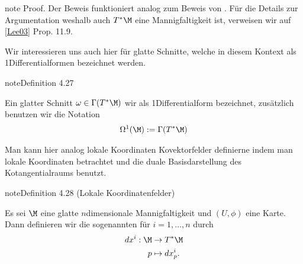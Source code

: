 \documentclass[letterpaper,10pt,german]{jupyterBook}
\begin{document}
\begin{sphinxadmonition}{note}
\sphinxAtStartPar
Proof. Der Beweis funktioniert analog zum Beweis von {\hyperref[\detokenize{manifolds/tangential:lem:tanbundle}]{}}. Für die Details zur Argumentation weshalb auch \(T^\ast\M\) eine Mannigfaltigkeit ist, verweisen wir auf {[}\hyperlink{cite.references:id18}{Lee03}{]} Prop. 11.9.
\end{sphinxadmonition}

\sphinxAtStartPar
Wir interessieren uns auch hier für glatte Schnitte, welche in diesem Kontext als 1\sphinxhyphen{}Differentialformen bezeichnet werden.
\label{manifolds/tangential:definition-37}
\begin{sphinxadmonition}{note}{Definition 4.27}



\sphinxAtStartPar
Ein glatter Schnitt \(\omega\in\Gamma(T^\ast\M)\) wir als 1\sphinxhyphen{}Differentialform bezeichnet, zusätzlich benutzen wir die Notation
\begin{equation*}
\begin{split}\Omega^1(\M) := \Gamma(T^\ast\M)\end{split}
\end{equation*}\end{sphinxadmonition}

\sphinxAtStartPar
Man kann hier analog lokale Koordinaten Kovektorfelder definierne indem man lokale Koordinaten betrachtet und die duale Basisdarstellung des Kotangentialraums benutzt.
\label{manifolds/tangential:definition-38}
\begin{sphinxadmonition}{note}{Definition 4.28 (Lokale Koordinatenfelder)}



\sphinxAtStartPar
Es sei \(\M\) eine glatte \(n\)\sphinxhyphen{}dimensionale Mannigfaltigkeit und \((U,\phi)\) eine Karte.
Dann definieren wir die sogenannten  für \(i=1,\ldots,n\) durch
\begin{equation*}
\begin{split}dx^{i}:\M&\to T^\ast\M\\
p&\mapsto dx^{i}_p. \end{split}
\end{equation*}\end{sphinxadmonition}
\end{document}
